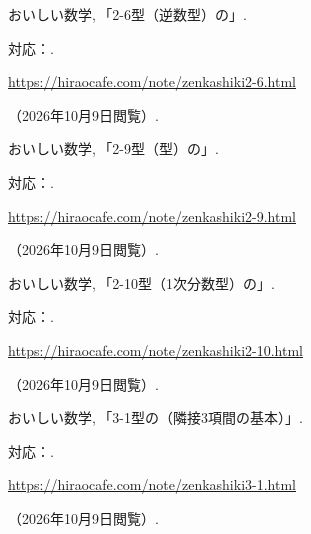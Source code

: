 \begin{enumerate}[resume,label={[\arabic*]}]
    \item \begin{minipage}[t]{\linewidth}\raggedright
        おいしい数学,\,「2-6型（逆数型）の」.
        \par{\small 対応：.\par}
        \par\noindent\url{https://hiraocafe.com/note/zenkashiki2-6.html}\par
        \noindent（2026年10月9日閲覧）.
      \end{minipage}\par\smallskip

    \item \begin{minipage}[t]{\linewidth}\raggedright
        おいしい数学,\,「2-9型（型）の」.
        \par{\small 対応：.\par}
        \par\noindent\url{https://hiraocafe.com/note/zenkashiki2-9.html}\par
        \noindent（2026年10月9日閲覧）.
      \end{minipage}\par\smallskip

    \item \begin{minipage}[t]{\linewidth}\raggedright
        おいしい数学,\,「2-10型（1次分数型）の」.
        \par{\small 対応：.\par}
        \par\noindent\url{https://hiraocafe.com/note/zenkashiki2-10.html}\par
        \noindent（2026年10月9日閲覧）.
      \end{minipage}\par\smallskip

    \item \begin{minipage}[t]{\linewidth}\raggedright
        おいしい数学,\,「3-1型の（隣接3項間の基本）」.
        \par{\small 対応：.\par}
        \par\noindent\url{https://hiraocafe.com/note/zenkashiki3-1.html}\par
        \noindent（2026年10月9日閲覧）.
      \end{minipage}\par\smallskip


\end{enumerate}
